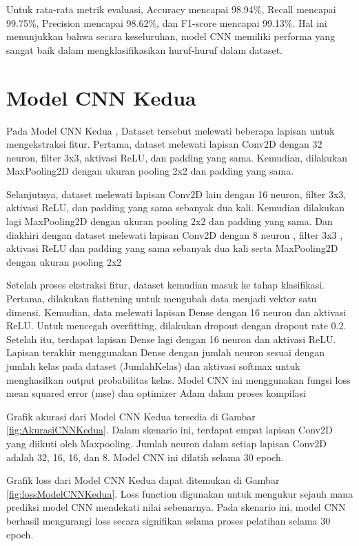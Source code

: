 Untuk rata-rata metrik evaluasi, Accuracy mencapai 98.94\%, Recall mencapai 99.75\%, Precision mencapai 98.62\%, dan F1-score mencapai 99.13\%. Hal ini menunjukkan bahwa secara keseluruhan, model CNN memiliki performa yang sangat baik dalam mengklasifikasikan huruf-huruf dalam dataset.


\section{Model CNN Kedua}
Pada Model CNN Kedua , Dataset tersebut melewati beberapa lapisan untuk mengekstraksi fitur. Pertama, dataset melewati lapisan Conv2D dengan 32 neuron, filter 3x3, aktivasi ReLU, dan padding yang sama. Kemudian, dilakukan MaxPooling2D dengan ukuran pooling 2x2 dan padding yang sama.

Selanjutnya, dataset melewati lapisan Conv2D lain dengan 16 neuron, filter 3x3, aktivasi ReLU, dan padding yang sama sebanyak dua kali. Kemudian dilakukan lagi MaxPooling2D dengan ukuran pooling 2x2 dan padding yang sama. Dan diakhiri dengan dataset melewati lapisan Conv2D dengan 8 neuron , filter 3x3 , aktivasi ReLU dan padding yang sama sebanyak dua kali serta MaxPooling2D dengan ukuran pooling 2x2 

Setelah proses ekstraksi fitur, dataset kemudian masuk ke tahap klasifikasi. Pertama, dilakukan flattening untuk mengubah data menjadi vektor satu dimensi. Kemudian, data melewati lapisan Dense dengan 16 neuron dan aktivasi ReLU. Untuk mencegah overfitting, dilakukan dropout dengan dropout rate 0.2. Setelah itu, terdapat lapisan Dense lagi dengan 16 neuron dan aktivasi ReLU. Lapisan terakhir menggunakan Dense dengan jumlah neuron sesuai dengan jumlah kelas pada dataset (JumlahKelas) dan aktivasi softmax untuk menghasilkan output probabilitas kelas. Model CNN ini menggunakan fungsi loss mean squared error (mse) dan optimizer Adam dalam proses kompilasi

Grafik akurasi dari Model CNN Kedua tersedia di Gambar \ref{fig:AkurasiCNNKedua}. Dalam skenario ini, terdapat empat lapisan Conv2D yang diikuti oleh Maxpooling. Jumlah neuron dalam setiap lapisan Conv2D adalah 32, 16, 16, dan 8. Model CNN ini dilatih selama 30 epoch.

Grafik loss dari Model CNN Kedua dapat ditemukan di Gambar \ref{fig:lossModelCNNKedua}. Loss function digunakan untuk mengukur sejauh mana prediksi model CNN mendekati nilai sebenarnya. Pada skenario ini, model CNN berhasil mengurangi loss secara signifikan selama proses pelatihan selama 30 epoch.

